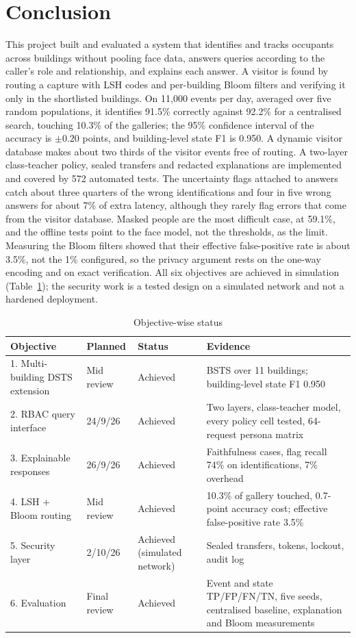 \documentclass[12pt,a4paper,oneside]{report}
\begin{document}
\section{Conclusion}
This project built and evaluated a system that identifies and tracks occupants across buildings without pooling face data, answers queries according to the caller's role and relationship, and explains each answer. A visitor is found by routing a capture with LSH codes and per-building Bloom filters and verifying it only in the shortlisted buildings. On 11,000 events per day, averaged over five random populations, it identifies 91.5\% correctly against 92.2\% for a centralised search, touching 10.3\% of the galleries; the 95\% confidence interval of the accuracy is $\pm0.20$ points, and building-level state F1 is 0.950. A dynamic visitor database makes about two thirds of the visitor events free of routing. A two-layer class-teacher policy, sealed transfers and redacted explanations are implemented and covered by 572 automated tests. The uncertainty flags attached to answers catch about three quarters of the wrong identifications and four in five wrong answers for about 7\% of extra latency, although they rarely flag errors that come from the visitor database. Masked people are the most difficult case, at 59.1\%, and the offline tests point to the face model, not the thresholds, as the limit. Measuring the Bloom filters showed that their effective false-positive rate is about 3.5\%, not the 1\% configured, so the privacy argument rests on the one-way encoding and on exact verification. All six objectives are achieved in simulation (Table~\ref{tab:status}); the security work is a tested design on a simulated network and not a hardened deployment.

\begin{table}[htbp]
\centering
\caption{Objective-wise status}\label{tab:status}
{\small\setlength{\tabcolsep}{4pt}\renewcommand{\arraystretch}{1.2}
\begin{tabular}{|p{4.6cm}|p{2.0cm}|p{2.6cm}|p{5.2cm}|}\hline
\textbf{Objective} & \textbf{Planned} & \textbf{Status} & \textbf{Evidence}\\\hline
1. Multi-building DSTS extension & Mid review & Achieved & BSTS over 11 buildings; building-level state F1 0.950\\\hline
2. RBAC query interface & 24/9/26 & Achieved & Two layers, class-teacher model, every policy cell tested, 64-request persona matrix\\\hline
3. Explainable responses & 26/9/26 & Achieved & Faithfulness cases, flag recall 74\% on identifications, 7\% overhead\\\hline
4. LSH + Bloom routing & Mid review & Achieved & 10.3\% of gallery touched, 0.7-point accuracy cost; effective false-positive rate 3.5\%\\\hline
5. Security layer & 2/10/26 & Achieved (simulated network) & Sealed transfers, tokens, lockout, audit log\\\hline
6. Evaluation & Final review & Achieved & Event and state TP/FP/FN/TN, five seeds, centralised baseline, explanation and Bloom measurements\\\hline
\end{tabular}}
\end{table}
\end{document}

